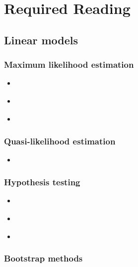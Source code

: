 \documentclass{report}
\begin{document}
\renewcommand\listoflistingscaption{List of Code Examples}
\listoftables
\begingroup
\let\clearpage\relax
\listofalgorithms
\listoflistings 
\endgroup

\chapter{Required Reading} \label{chap:required-reading}

\section{Linear models}\label{sec:reading-ols}

\subsection{Maximum likelihood estimation}

\begin{itemize}
    \item \cite[Chapter~2]{faraway_linear_2015} 
    \item \cite[Chapter~2]{wakefield_bayesian_2013}
    \item \cite[Chapter~2.1]{agresti_foundations_2015}
\end{itemize}

\subsection{Quasi-likelihood estimation}

\begin{itemize}
    \item \cite[Chapter~2.5]{wakefield_bayesian_2013}
\end{itemize}

\subsection{Hypothesis testing}

\begin{itemize}
    \item \cite[Chapter~3]{faraway_linear_2015}
    \item \cite[Chapter~2.9]{wakefield_bayesian_2013}
    \item \cite[Chapter~3.2]{agresti_foundations_2015}
\end{itemize}

\subsection{Bootstrap methods}
\end{document}
